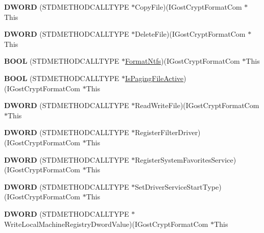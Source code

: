 \begin{DoxyCompactItemize}
{\bfseries D\+W\+O\+RD} (S\+T\+D\+M\+E\+T\+H\+O\+D\+C\+A\+L\+L\+T\+Y\+PE $\ast$Copy\+File)(I\+Gost\+Crypt\+Format\+Com $\ast$This
\item 
\mbox{\label{struct_i_gost_crypt_format_com_vtbl_aec9de0ef500e07e3fde0f6c4706e501a}} 
{\bfseries D\+W\+O\+RD} (S\+T\+D\+M\+E\+T\+H\+O\+D\+C\+A\+L\+L\+T\+Y\+PE $\ast$Delete\+File)(I\+Gost\+Crypt\+Format\+Com $\ast$This
\item 
\mbox{\label{struct_i_gost_crypt_format_com_vtbl_a01d8a69442bfa6f58db03251e2cd42b3}} 
{\bfseries B\+O\+OL} (S\+T\+D\+M\+E\+T\+H\+O\+D\+C\+A\+L\+L\+T\+Y\+PE $\ast$\hyperlink{_format_8c_a96dcf751b1190c28e170c94ceca39849}{Format\+Ntfs})(I\+Gost\+Crypt\+Format\+Com $\ast$This
\item 
\mbox{\label{struct_i_gost_crypt_format_com_vtbl_a39cd4c6cdbd656b668e3f136193b723d}} 
{\bfseries B\+O\+OL} (S\+T\+D\+M\+E\+T\+H\+O\+D\+C\+A\+L\+L\+T\+Y\+PE $\ast$\hyperlink{_dlgcode_8c_a4683f63544f31aee5130df039402b772}{Is\+Paging\+File\+Active})(I\+Gost\+Crypt\+Format\+Com $\ast$This
\item 
\mbox{\label{struct_i_gost_crypt_format_com_vtbl_ab777b9f2799dfa5fe9b71e36d8719379}} 
{\bfseries D\+W\+O\+RD} (S\+T\+D\+M\+E\+T\+H\+O\+D\+C\+A\+L\+L\+T\+Y\+PE $\ast$Read\+Write\+File)(I\+Gost\+Crypt\+Format\+Com $\ast$This
\item 
\mbox{\label{struct_i_gost_crypt_format_com_vtbl_a038a6dee1a7e6c617743ec7e9692e54b}} 
{\bfseries D\+W\+O\+RD} (S\+T\+D\+M\+E\+T\+H\+O\+D\+C\+A\+L\+L\+T\+Y\+PE $\ast$Register\+Filter\+Driver)(I\+Gost\+Crypt\+Format\+Com $\ast$This
\item 
\mbox{\label{struct_i_gost_crypt_format_com_vtbl_acccc5d489d5621c04a55bffcfed897d4}} 
{\bfseries D\+W\+O\+RD} (S\+T\+D\+M\+E\+T\+H\+O\+D\+C\+A\+L\+L\+T\+Y\+PE $\ast$Register\+System\+Favorites\+Service)(I\+Gost\+Crypt\+Format\+Com $\ast$This
\item 
\mbox{\label{struct_i_gost_crypt_format_com_vtbl_abcc2cbb8993f67f2533a08fb2299cc23}} 
{\bfseries D\+W\+O\+RD} (S\+T\+D\+M\+E\+T\+H\+O\+D\+C\+A\+L\+L\+T\+Y\+PE $\ast$Set\+Driver\+Service\+Start\+Type)(I\+Gost\+Crypt\+Format\+Com $\ast$This
\item 
\mbox{\label{struct_i_gost_crypt_format_com_vtbl_ad04c681708e489f86957ee66ee386250}} 
{\bfseries D\+W\+O\+RD} (S\+T\+D\+M\+E\+T\+H\+O\+D\+C\+A\+L\+L\+T\+Y\+PE $\ast$Write\+Local\+Machine\+Registry\+Dword\+Value)(I\+Gost\+Crypt\+Format\+Com $\ast$This
\end{DoxyCompactItemize}
